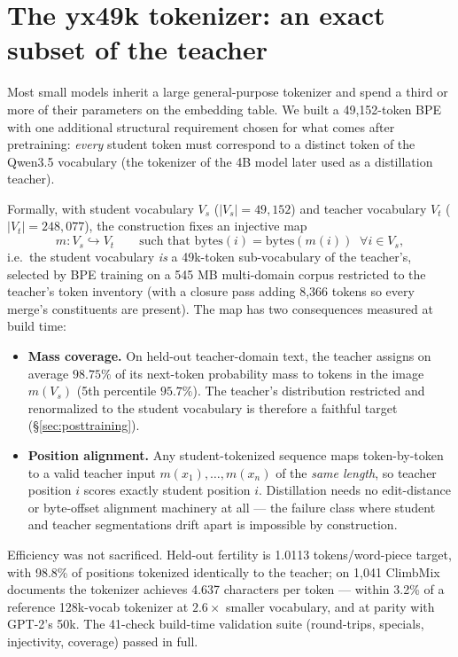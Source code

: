 \section{The yx49k tokenizer: an exact subset of the teacher}
\label{sec:tokenizer}

Most small models inherit a large general-purpose tokenizer and spend a
third or more of their parameters on the embedding table. We built a
49{,}152-token BPE with one additional structural requirement chosen for
what comes after pretraining: \emph{every} student token must correspond
to a distinct token of the Qwen3.5 vocabulary (the tokenizer of the 4B
model later used as a distillation teacher).

Formally, with student vocabulary $V_s$ ($|V_s| = 49{,}152$) and teacher
vocabulary $V_t$ ($|V_t| = 248{,}077$), the construction fixes an
injective map
\begin{equation}
m : V_s \hookrightarrow V_t
\qquad \text{such that } \mathrm{bytes}(i) = \mathrm{bytes}(m(i))
\;\; \forall i \in V_s,
\label{eq:subset-map}
\end{equation}
i.e.\ the student vocabulary \emph{is} a 49k-token sub-vocabulary of the
teacher's, selected by BPE training on a 545 MB multi-domain corpus
restricted to the teacher's token inventory (with a closure pass adding
8{,}366 tokens so every merge's constituents are present). The map has
two consequences measured at build time:
\begin{itemize}
  \item \textbf{Mass coverage.} On held-out teacher-domain text, the
  teacher assigns on average $98.75\%$ of its next-token probability
  mass to tokens in the image $m(V_s)$ (5th percentile $95.7\%$). The
  teacher's distribution restricted and renormalized to the student
  vocabulary is therefore a faithful target (\S\ref{sec:posttraining}).
  \item \textbf{Position alignment.} Any student-tokenized sequence maps
  token-by-token to a valid teacher input $m(x_1), \ldots, m(x_n)$ of
  the \emph{same length}, so teacher position $i$ scores exactly student
  position $i$. Distillation needs no edit-distance or byte-offset
  alignment machinery at all --- the failure class where student and
  teacher segmentations drift apart is impossible by construction.
\end{itemize}

Efficiency was not sacrificed. Held-out fertility is 1.0113
tokens/word-piece target, with 98.8\% of positions tokenized identically
to the teacher; on 1{,}041 ClimbMix documents the tokenizer achieves
4.637 characters per token --- within 3.2\% of a reference 128k-vocab
tokenizer at $2.6\times$ smaller vocabulary, and at parity with GPT-2's
50k. The 41-check build-time validation suite (round-trips, specials,
injectivity, coverage) passed in full.

